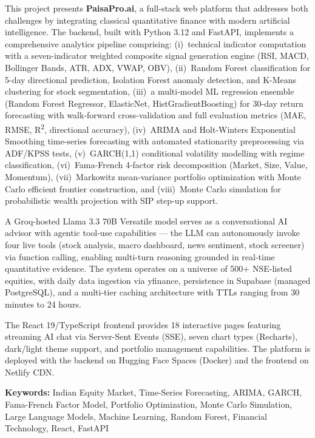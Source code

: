 \documentclass[12pt, a4paper, oneside]{report}
\newcommand{\projectname}{PaisaPro.ai}
\begin{document}
\vspace{0.5cm}
This project presents \textbf{\projectname{}}, a full-stack web platform that addresses both challenges by integrating classical quantitative finance with modern artificial intelligence. The backend, built with Python 3.12 and FastAPI, implements a comprehensive analytics pipeline comprising: (i)~technical indicator computation with a seven-indicator weighted composite signal generation engine (RSI, MACD, Bollinger Bands, ATR, ADX, VWAP, OBV), (ii)~Random Forest classification for 5-day directional prediction, Isolation Forest anomaly detection, and K-Means clustering for stock segmentation, (iii)~a multi-model ML regression ensemble (Random Forest Regressor, ElasticNet, HistGradientBoosting) for 30-day return forecasting with walk-forward cross-validation and full evaluation metrics (MAE, RMSE, R\textsuperscript{2}, directional accuracy), (iv)~ARIMA and Holt-Winters Exponential Smoothing time-series forecasting with automated stationarity preprocessing via ADF/KPSS tests, (v)~GARCH(1,1) conditional volatility modelling with regime classification, (vi)~Fama-French 4-factor risk decomposition (Market, Size, Value, Momentum), (vii)~Markowitz mean-variance portfolio optimization with Monte Carlo efficient frontier construction, and (viii)~Monte Carlo simulation for probabilistic wealth projection with SIP step-up support.

\vspace{0.5cm}
A Groq-hosted Llama 3.3 70B Versatile model serves as a conversational AI advisor with agentic tool-use capabilities --- the LLM can autonomously invoke four live tools (stock analysis, macro dashboard, news sentiment, stock screener) via function calling, enabling multi-turn reasoning grounded in real-time quantitative evidence. The system operates on a universe of 500+ NSE-listed equities, with daily data ingestion via yfinance, persistence in Supabase (managed PostgreSQL), and a multi-tier caching architecture with TTLs ranging from 30 minutes to 24 hours.

\vspace{0.5cm}
The React 19/TypeScript frontend provides 18 interactive pages featuring streaming AI chat via Server-Sent Events (SSE), seven chart types (Recharts), dark/light theme support, and portfolio management capabilities. The platform is deployed with the backend on Hugging Face Spaces (Docker) and the frontend on Netlify CDN.

\vspace{0.5cm}
\textbf{Keywords:} Indian Equity Market, Time-Series Forecasting, ARIMA, GARCH, Fama-French Factor Model, Portfolio Optimization, Monte Carlo Simulation, Large Language Models, Machine Learning, Random Forest, Financial Technology, React, FastAPI
\end{document}
